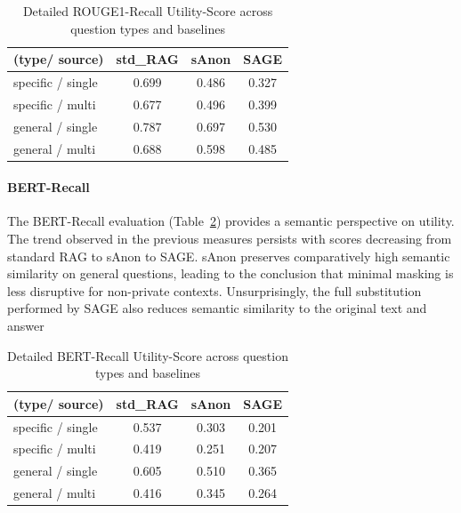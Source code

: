 \begin{table}[h!]
\centering
\caption{Detailed ROUGE1-Recall Utility-Score across question types and baselines}
\label{evaluation-tab:utility-rouge-details}
\begin{tabular}{l c c c}
\toprule
\textbf{(type/ source)} & \textbf{std\_RAG} & \textbf{sAnon} & \textbf{SAGE} \\
\midrule
specific / single & 0.699 & 0.486 & 0.327 \\
specific / multi & 0.677 & 0.496 & 0.399 \\
general / single & 0.787 & 0.697 & 0.530 \\
general / multi & 0.688 & 0.598 & 0.485 \\
\bottomrule
\end{tabular}
\end{table}

\paragraph{BERT-Recall}
The BERT-Recall evaluation (Table~\ref{evaluation-tab:utility-bert-details}) provides a semantic perspective on utility. The trend observed in the previous measures persists with scores decreasing from standard RAG to sAnon to SAGE. sAnon preserves comparatively high semantic similarity on general questions, leading to the conclusion that minimal masking is less disruptive for non-private contexts. Unsurprisingly, the full substitution performed by SAGE also reduces semantic similarity to the original text and answer


\begin{table}[h!]
\centering
\caption{Detailed BERT-Recall Utility-Score across question types and baselines}
\label{evaluation-tab:utility-bert-details}
\begin{tabular}{l c c c}
\toprule
\textbf{(type/ source)} & \textbf{std\_RAG} & \textbf{sAnon} & \textbf{SAGE} \\
\midrule
specific / single & 0.537 & 0.303 & 0.201 \\
specific / multi & 0.419 & 0.251 & 0.207 \\
general / single & 0.605 & 0.510 & 0.365 \\
general / multi & 0.416 & 0.345 & 0.264 \\
\bottomrule
\end{tabular}
\end{table}
